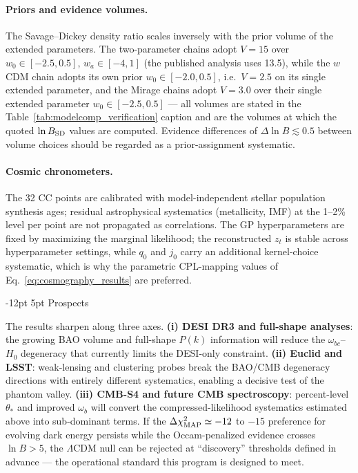 \documentclass[11pt,letterpaper]{article}
\makeatletter
\renewcommand{\subsection}{\@startsection{subsection}{2}{\z@}%
  {-12pt \@plus -3pt \@minus -1pt}%
  {5pt \@plus 1pt}%
  {\normalfont\large\bfseries\color{tealaccent}}}
\makeatother
\begin{document}
\paragraph{Priors and evidence volumes.} The Savage--Dickey density ratio scales inversely with the prior volume of the extended parameters. The two-parameter chains adopt $V = 15$ over $w_0 \in [-2.5, 0.5]$, $w_a \in [-4, 1]$ (the published analysis uses 13.5), while the $w$CDM chain adopts its own prior $w_0 \in [-2.0, 0.5]$, i.e.\ $V = 2.5$ on its single extended parameter, and the Mirage chains adopt $V = 3.0$ over their single extended parameter $w_0 \in [-2.5, 0.5]$ --- all volumes are stated in the Table~\ref{tab:modelcomp_verification} caption and are the volumes at which the quoted $\ln B_{\rm SD}$ values are computed. Evidence differences of $\Delta\ln B \lesssim 0.5$ between volume choices should be regarded as a prior-assignment systematic.

\paragraph{Cosmic chronometers.} The 32 CC points are calibrated with model-independent stellar population synthesis ages; residual astrophysical systematics (metallicity, IMF) at the 1--2\% level per point are not propagated as correlations. The GP hyperparameters are fixed by maximizing the marginal likelihood; the reconstructed $z_t$ is stable across hyperparameter settings, while $q_0$ and $j_0$ carry an additional kernel-choice systematic, which is why the parametric CPL-mapping values of Eq.~\ref{eq:cosmography_results} are preferred.

\subsection{Prospects}

The results sharpen along three axes. \textbf{(i) DESI DR3 and full-shape analyses}: the growing BAO volume and full-shape $P(k)$ information will reduce the $\omega_{bc}$--$H_0$ degeneracy that currently limits the DESI-only constraint. \textbf{(ii) Euclid and LSST}: weak-lensing and clustering probes break the BAO/CMB degeneracy directions with entirely different systematics, enabling a decisive test of the phantom valley. \textbf{(iii) CMB-S4 and future CMB spectroscopy}: percent-level $\theta_*$ and improved $\omega_b$ will convert the compressed-likelihood systematics estimated above into sub-dominant terms. If the $\Delta\chi^2_{\rm MAP} \simeq -12$ to $-15$ preference for evolving dark energy persists while the Occam-penalized evidence crosses $\ln B > 5$, the $\Lambda$CDM null can be rejected at ``discovery'' thresholds defined in advance --- the operational standard this program is designed to meet.
\end{document}
